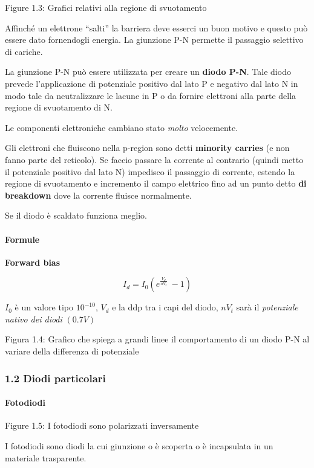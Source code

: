 \documentclass[
]{article}
\begin{document}
Figure 1.3: Grafici relativi alla regione di svuotamento

Affinché un elettrone ``salti'' la barriera deve esserci un buon motivo
e questo può essere dato fornendogli energia. La giunzione P-N permette
il passaggio selettivo di cariche.

La giunzione P-N può essere utilizzata per creare un \textbf{diodo P-N}.
Tale diodo prevede l'applicazione di potenziale positivo dal lato P e
negativo dal lato N in modo tale da neutralizzare le lacune in P o da
fornire elettroni alla parte della regione di svuotamento di N.

Le componenti elettroniche cambiano stato \emph{molto} velocemente.

Gli elettroni che fluiscono nella p-region sono detti \textbf{minority
carries} (e non fanno parte del reticolo). Se faccio passare la corrente
al contrario (quindi metto il potenziale positivo dal lato N) impedisco
il passaggio di corrente, estendo la regione di svuotamento e incremento
il campo elettrico fino ad un punto detto \textbf{di breakdown} dove la
corrente fluisce normalmente.

Se il diodo è scaldato funziona meglio.

\paragraph{Formule}\label{formule}

\textbf{Forward bias}

\[I_{d}=I_{0}(e^{\frac{V_{d}}{nV_{t}}}\ -1)\]

\(I_{0}\) è un valore tipo \(10^{-10}\), \(V_{d}\) e la ddp tra i capi
del diodo, \(nV_{t}\) sarà il \emph{potenziale nativo dei diodi}
\((0.7V)\)

Figura 1.4: Grafico che spiega a grandi linee il comportamento di un
diodo P-N al variare della differenza di potenziale

\subsubsection{1.2 Diodi particolari}\label{diodi-particolari}

\paragraph{Fotodiodi}\label{fotodiodi}

Figure 1.5: I fotodiodi sono polarizzati inversamente

I fotodiodi sono diodi la cui giunzione o è scoperta o è incapsulata in
un materiale trasparente.
\end{document}
